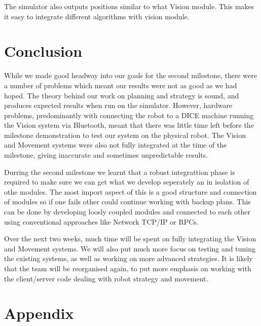 \documentclass[conference,12pt]{IEEEtran}
\begin{document}
The simulator also outputs positions similar to what Vision module. This makes it easy to integrate different algorithms with vision module. 
\vspace{-2 mm}
\section{Conclusion}
\vspace{-2 mm}
While we made good headway into our goals for the second milestone, there were a number of problems which meant our results were not as good as we had hoped. The theory behind our work on planning and strategy is sound, and produces expected results when run on the simulator. However, hardware problems, predominantly with connecting the robot to a DICE machine running the Vision system via Bluetooth, meant that there was little time left before the milestone demonstration to test our system on the physical robot. The Vision and Movement systems were also not fully integrated at the time of the milestone, giving inaccurate and sometimes unpredictable results.

Durring the second milestone we learnt that a robust integrattion phase is required to make sure we can get what we develop seperately an in isolation of othe modules. The most import aspect of this is a good structure and connection of modules so if one fails other could continue working with backup plans. This can be done by developing loosly coupled modules and connected to each other using conventional approaches like Network TCP/IP or RPCs.

Over the next two weeks, much time will be spent on fully integrating the Vision and Movement systems. We will also put much more focus on testing and tuning the existing systems, as well as working on more advanced strategies. It is likely that the team will be reorganised again, to put more emphasis on working with the client/server code dealing with robot strategy and movement. 
\pagebreak



\section{Appendix}
\end{document}
